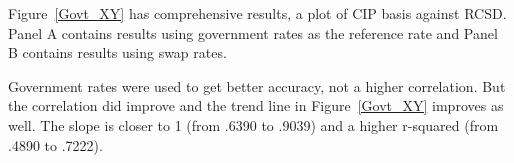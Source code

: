 

 





 


 

Figure~\ref{Govt_XY} has comprehensive results, a plot of CIP basis against RCSD.  Panel A contains results using government rates as the reference rate and Panel B contains results using swap rates.

Government rates were used to get better accuracy, not a higher correlation.  But the correlation did improve and the trend line in Figure~\ref{Govt_XY} improves as well.  The slope is closer to 1 (from .6390 to .9039) and a higher r-squared (from .4890 to .7222).



